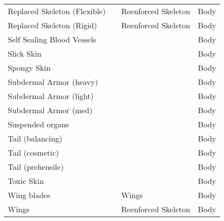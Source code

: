 \documentclass[twoside]{book}
\begin{document}
\begin{longtable}{p{1.25in}p{2em}ll}
      \raggedright Replaced Skeleton (Flexible)&&Reenforced Skeleton&Body\tabularnewline
      \raggedright Replaced Skeleton (Rigid)&&Reenforced Skeleton&Body\tabularnewline
      \raggedright Self Sealing Blood Vessels&&&Body\tabularnewline
      \raggedright Slick Skin&&&Body\tabularnewline
      \raggedright Spongy Skin&&&Body\tabularnewline
      \raggedright Subdermal Armor (heavy)&&&Body\tabularnewline
      \raggedright Subdermal Armor (light)&&&Body\tabularnewline
      \raggedright Subdermal Armor (med)&&&Body\tabularnewline
      \raggedright Suspended organs&&&Body\tabularnewline
      \raggedright Tail (balancing)&&&Body\tabularnewline
      \raggedright Tail (cosmetic)&&&Body\tabularnewline
      \raggedright Tail (prehensile)&&&Body\tabularnewline
      \raggedright Toxic Skin&&&Body\tabularnewline
      \raggedright Wing blades&&Wings&Body\tabularnewline
      \raggedright Wings&&Reenforced Skeleton&Body\tabularnewline
      
\end{longtable}
    
\end{document}
